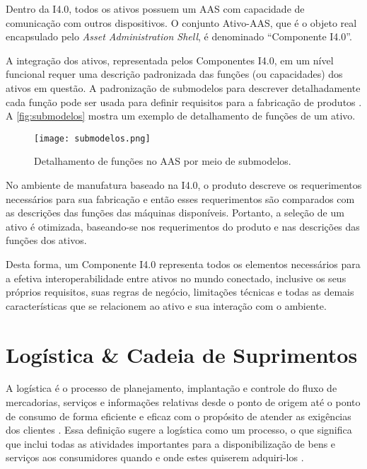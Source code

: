 	Dentro da I4.0, todos os ativos possuem um AAS com capacidade de comunicação com outros dispositivos. O conjunto Ativo-AAS, que é o objeto real encapsulado pelo \textit{Asset Administration Shell}, é denominado ``Componente I4.0''.
	
	A integração dos ativos, representada pelos Componentes I4.0, em um nível funcional requer uma descrição padronizada das funções (ou capacidades) dos ativos em questão. A padronização de submodelos para descrever detalhadamente cada função pode ser usada para definir requisitos para a fabricação de produtos \cite{bedenbender2017aasexamples}. A \autoref{fig:submodelos} mostra um exemplo de detalhamento de funções de um ativo.
	
	\begin{figure}[htb]
		\centering
		\label{fig:submodelos}
		\texttt{[image: submodelos.png]}
		\caption{Detalhamento de funções no AAS por meio de submodelos.}
	\end{figure}

	No ambiente de manufatura baseado na I4.0, o produto descreve os requerimentos necessários para sua fabricação e então esses requerimentos são comparados com as descrições das funções das máquinas disponíveis. Portanto, a seleção de um ativo é otimizada, baseando-se nos requerimentos do produto e nas descrições das funções dos ativos.
	
	Desta forma, um Componente I4.0 representa todos os elementos necessários para a efetiva interoperabilidade entre ativos no mundo conectado, inclusive os seus próprios requisitos, suas regras de negócio, limitações técnicas e todas as demais características que se relacionem ao ativo e sua interação com o ambiente.
	
\section{Logística \& Cadeia de Suprimentos}
\label{sec:logistica}
	
	A logística é o processo de planejamento, implantação e controle do fluxo de mercadorias, serviços e informações relativas desde o ponto de origem até o ponto de consumo de forma eficiente e eficaz com o propósito de atender as exigências dos clientes \cite{cscmp2013supplychainglossary}. Essa definição sugere a logística como um processo, o que significa que inclui todas as atividades importantes para a disponibilização de bens e serviços aos consumidores quando e onde estes quiserem adquiri-los \cite{ballou2006cadeiasuprimentos}.
	
